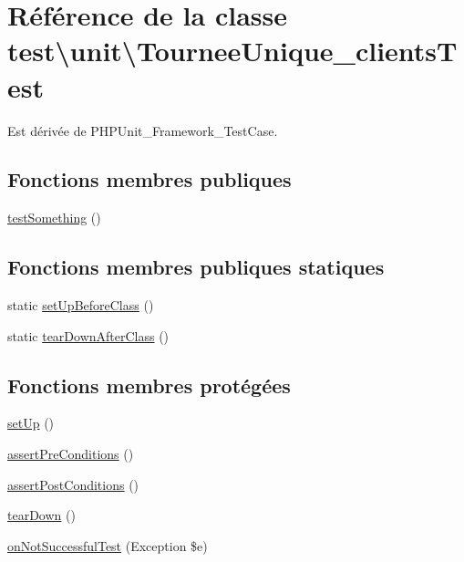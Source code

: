 \hypertarget{classtest_1_1unit_1_1TourneeUnique__clientsTest}{}\section{Référence de la classe test\textbackslash{}unit\textbackslash{}Tournee\+Unique\+\_\+clients\+Test}
\label{classtest_1_1unit_1_1TourneeUnique__clientsTest}


Est dérivée de P\+H\+P\+Unit\+\_\+\+Framework\+\_\+\+Test\+Case.

\subsection*{Fonctions membres publiques}
\begin{DoxyCompactItemize}
\item 
\hyperlink{classtest_1_1unit_1_1TourneeUnique__clientsTest_ad351aaef5dc4be2d59c8fb28edb5014b}{test\+Something} ()
\end{DoxyCompactItemize}
\subsection*{Fonctions membres publiques statiques}
\begin{DoxyCompactItemize}
\item 
static \hyperlink{classtest_1_1unit_1_1TourneeUnique__clientsTest_a437690e116ade8f658625ae2751bad88}{set\+Up\+Before\+Class} ()
\item 
static \hyperlink{classtest_1_1unit_1_1TourneeUnique__clientsTest_af4045a00f0c9134323e9c934c5cce99e}{tear\+Down\+After\+Class} ()
\end{DoxyCompactItemize}
\subsection*{Fonctions membres protégées}
\begin{DoxyCompactItemize}
\item 
\hyperlink{classtest_1_1unit_1_1TourneeUnique__clientsTest_afb8d623cb6ccb48e021121e8d70ded75}{set\+Up} ()
\item 
\hyperlink{classtest_1_1unit_1_1TourneeUnique__clientsTest_a7d547a89ee76dcf6351dd01e2f2ca109}{assert\+Pre\+Conditions} ()
\item 
\hyperlink{classtest_1_1unit_1_1TourneeUnique__clientsTest_ae12bfd7e68368d6251ef1228239e70fc}{assert\+Post\+Conditions} ()
\item 
\hyperlink{classtest_1_1unit_1_1TourneeUnique__clientsTest_a228d8858964193fccd4e361912ce8291}{tear\+Down} ()
\item 
\hyperlink{classtest_1_1unit_1_1TourneeUnique__clientsTest_a3fa53f43d2fe49412c6bf4ed68eebe49}{on\+Not\+Successful\+Test} (Exception \$e)
\end{DoxyCompactItemize}


